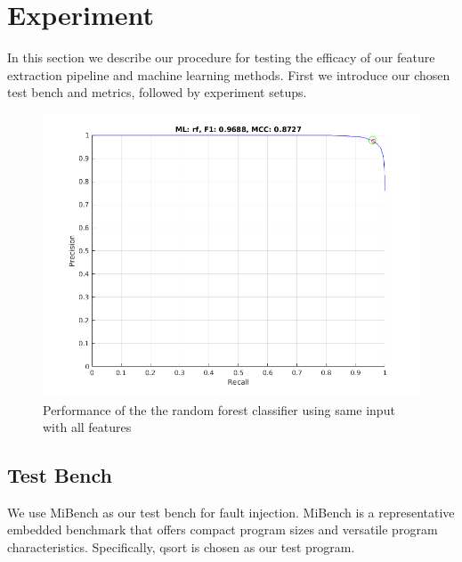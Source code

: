 \section{Experiment}
In this section we describe our procedure for testing the efficacy of our feature extraction pipeline and machine learning methods. First we introduce our chosen test bench and metrics, followed by experiment setups.

\begin{figure}[t]
\begin{center}
   \includegraphics[width=0.8\linewidth]{./figures/siaf.png}
\end{center}
 \vspace{-0.4cm}
   \caption{Performance of the the random forest classifier using same input with all features}
   \vspace{-0.3cm}
\label{fig:siaf}
\end{figure}

\subsection{Test Bench}
We use MiBench \cite{guthaus2001mibench} as our test bench for fault injection. MiBench is a representative embedded benchmark that offers compact program sizes and versatile program characteristics. Specifically, qsort is chosen as our test program.

